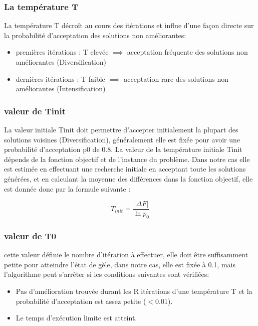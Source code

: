 \documentclass[12pt]{article}
\begin{document}
\subsubsection{La température T}
La température T décroît au cours des itérations et influe d’une façon directe sur la probabilité d’acceptation des solutions non améliorantes: 
\begin{itemize}
    \item premières itérations : T elevée $\implies $ acceptation fréquente des solutions non améliorantes (Diversification)
    \item dernières itérations : T faible $\implies $ acceptation rare des solutions non améliorantes (Intensification) 
    
\end{itemize}

\subsubsection{valeur de Tinit}
La valeur initiale Tinit doit permettre d’accepter initialement la plupart des solutions voisines (Diversification), généralement elle est fixée pour avoir une probabilité d’acceptation p0 de 0.8. 
La valeur de la température initiale Tinit dépends de la fonction objectif et de l’instance du problème. Dans notre cas elle est estimée en effectuant une recherche initiale en acceptant toute les solutions générées, et en calculant la moyenne des différences dans la fonction objectif, elle est donnée donc par la formule suivante : 

\begin{equation}
    T_{init} = \frac{|\Delta F|}{\ln p_{0}}
\end{equation}
\subsubsection{valeur de T0}
cette valeur définie le nombre d’itération à effectuer, elle doit être suffisamment petite pour atteindre l’état de gèle, dans notre cas, elle est fixée à 0.1, mais l’algorithme  peut s’arrêter si les conditions suivantes sont vérifiées: 
\begin{itemize}
    \item Pas d’amélioration trouvée durant les R itérations d’une température T
    et la probabilité d’acceptation est assez petite ($<0.01$).
    \item Le temps d'exécution limite est atteint.
\end{itemize}
\end{document}
